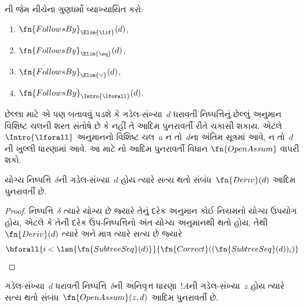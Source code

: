 \begin{prob}
  ની
  જેમ નીચેના ગુણધર્મો વ્યાખ્યાયિત કરો:
  \begin{enumerate}
  \item $\fn{FollowsBy}_{\Elim{\lif}}(d)$,
  \item $\fn{FollowsBy}_{\Elim{\eq}}(d)$,
  \item $\fn{FollowsBy}_{\Elim{\lor}}(d)$,
  \item $\fn{FollowsBy}_{\Intro{\lforall}}(d)$.
  \end{enumerate}
  છેલ્લા માટે એ પણ બતાવવું પડશે કે
  ગડેલ-સંખ્યા~$d$ ધરાવતી
  નિષ્પત્તિનું છેલ્લું અનુમાન
  વિશિષ્ટ ચલની શરત સંતોષે છે કે નહીં
  તે આદિમ પુનરાવર્તી રીતે ચકાસી શકાય.
  એટલે $\Intro{\lforall}$ અનુમાનનો
  વિશિષ્ટ ચલ~$a$ ન તો~$d$ના
  અંતિમ સૂત્રમાં આવે, ન તો~$d$ની
  ખુલ્લી ધારણામાં આવે. આ માટે
  નો
  આદિમ પુનરાવર્તી વિધાન
  $\fn{OpenAssum}$ વાપરી શકો.
\end{prob}

\begin{prop}
  યોગ્ય નિષ્પત્તિ~$\delta$ની
  ગડેલ-સંખ્યા~$d$ હોય ત્યારે સત્ય
  થતો સંબંધ~$\fn{Deriv}(d)$ આદિમ
  પુનરાવર્તી છે.
\end{prop}

\begin{proof}
  નિષ્પત્તિ~$\delta$ ત્યારે યોગ્ય
  છે જ્યારે તેનું દરેક અનુમાન કોઈ
  નિયમનો યોગ્ય ઉપયોગ હોય, એટલે કે
  તેની દરેક ઉપ-નિષ્પત્તિનો અંત
  યોગ્ય અનુમાનથી થતો હોય. તેથી
  $\fn{Deriv}(d)$ ત્યારે અને માત્ર
  ત્યારે સત્ય છે જ્યારે
  \[
  \bforall{i<\len{\fn{SubtreeSeq}(d)}}{\fn{Correct}((\fn{SubtreeSeq}(d))_i)}
  \]
\end{proof}

\begin{prop}
  ગડેલ-સંખ્યા~$d$ ધરાવતી
  નિષ્પત્તિ~$\delta$ની
  અનિવૃત્ત ધારણા~$!A$ની
  ગડેલ-સંખ્યા~$z$ હોય ત્યારે સત્ય
  થતો સંબંધ~$\fn{OpenAssum}(z, d)$
  આદિમ પુનરાવર્તી છે.
\end{prop}

